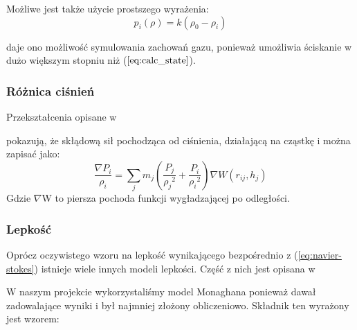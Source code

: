 \documentclass[polish, 12pt]{aghthesis}
\begin{document}
			Możliwe jest także użycie prostszego wyrażenia:	
			\[p_i(\rho) = k(\rho_0 - \rho_i) \tag{8.1}\]
			
			daje ono możliwość symulowania zachowań gazu, ponieważ umożliwia ściskanie w dużo większym stopniu niż ($\ref{eq:calc_state}$).
			
			\subsubsection{Różnica ciśnień}
			Przekształcenia opisane w 
			
			\begin{comment}
			\begin{verbatim} 
			
			https://mail-attachment.googleusercontent.com/attachment/u/0/?ui=2&ik=0de943f1dc&view=att&th=14a6f878d3d5bcd7&attid=0.1&disp=inline&realattid=f0542169af95b747_0.1&safe=1&zw&saduie=AG9B_P-TA2-idqG0MQqY4q5EAvip&sadet=1420650131132&sads=RLJfbKiezWhS0D0KM1B7LKtfXcI&sadssc=1		
			\end{verbatim}
			\end{comment}
			
			pokazują, że skłądową sił pochodząca od ciśnienia, działającą na cząstkę i można zapisać jako: \[\frac{\nabla P_i}{\rho_i} = \sum_j m_j(\frac{P_j}{{\rho_j}^2} + \frac{P_i}{{\rho_i}^2})\nabla W(r_{ij}, h_j) \label{eq:calc_pressure} \tag{9}\] Gdzie ${\nabla}$W to piersza pochoda funkcji wygładzającej po odległości.
			
			\subsubsection{Lepkość}
			Oprócz oczywistego wzoru na lepkość wynikającego bezpośrednio z (\ref{eq:navier-stokes}) istnieje wiele innych modeli lepkości. Część z nich jest opisana w 
			
			\begin{comment}
			\begin{verbatim} 
			https://mail-attachment.googleusercontent.com/attachment/u/0/?ui=2&ik=0de943f1dc&view=att&th=14a6f878d3d5bcd7&attid=0.1&disp=inline&realattid=f0542169af95b747_0.1&safe=1&zw&saduie=AG9B_P-TA2-idqG0MQqY4q5EAvip&sadet=1420650131132&sads=RLJfbKiezWhS0D0KM1B7LKtfXcI&sadssc=1
			\end{verbatim}
			\end{comment}
			
			W naszym projekcie wykorzystaliśmy model Monaghana ponieważ dawał zadowalające wyniki i był najmniej złożony obliczeniowo. Składnik ten wyrażony jest wzorem:
			
\end{document}
